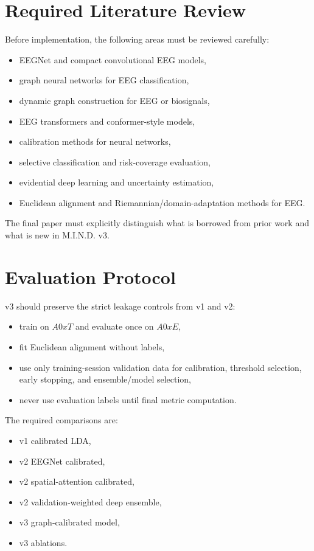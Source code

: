 \documentclass[11pt]{article}
\begin{document}
\section{Required Literature Review}

Before implementation, the following areas must be reviewed carefully:
\begin{itemize}
  \item EEGNet and compact convolutional EEG models,
  \item graph neural networks for EEG classification,
  \item dynamic graph construction for EEG or biosignals,
  \item EEG transformers and conformer-style models,
  \item calibration methods for neural networks,
  \item selective classification and risk-coverage evaluation,
  \item evidential deep learning and uncertainty estimation,
  \item Euclidean alignment and Riemannian/domain-adaptation methods for EEG.
\end{itemize}
The final paper must explicitly distinguish what is borrowed from prior work
and what is new in M.I.N.D. v3.

\section{Evaluation Protocol}

v3 should preserve the strict leakage controls from v1 and v2:
\begin{itemize}
  \item train on \(A0xT\) and evaluate once on \(A0xE\),
  \item fit Euclidean alignment without labels,
  \item use only training-session validation data for calibration, threshold
  selection, early stopping, and ensemble/model selection,
  \item never use evaluation labels until final metric computation.
\end{itemize}

The required comparisons are:
\begin{itemize}
  \item v1 calibrated LDA,
  \item v2 EEGNet calibrated,
  \item v2 spatial-attention calibrated,
  \item v2 validation-weighted deep ensemble,
  \item v3 graph-calibrated model,
  \item v3 ablations.
\end{itemize}
\end{document}

